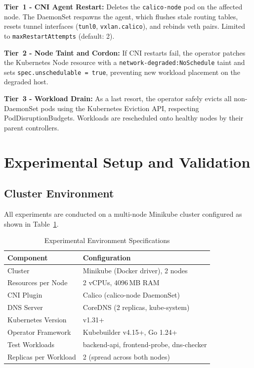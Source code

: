 \documentclass[conference]{IEEEtran}
\begin{document}
\noindent\textbf{Tier~1 - CNI Agent Restart:} Deletes the \texttt{calico-node} pod on the affected node. The DaemonSet respawns the agent, which flushes stale routing tables, resets tunnel interfaces (\texttt{tunl0}, \texttt{vxlan.calico}), and rebinds veth pairs. Limited to \texttt{maxRestartAttempts} (default: 2).

\noindent\textbf{Tier~2 - Node Taint and Cordon:} If CNI restarts fail, the operator patches the Kubernetes Node resource with a \texttt{network-degraded:NoSchedule} taint and sets \texttt{spec.unschedulable = true}, preventing new workload placement on the degraded host.

\noindent\textbf{Tier~3 - Workload Drain:} As a last resort, the operator safely evicts all non-DaemonSet pods using the Kubernetes Eviction API, respecting PodDisruptionBudgets. Workloads are rescheduled onto healthy nodes by their parent controllers.


\section{Experimental Setup and Validation}

\subsection{Cluster Environment}
All experiments are conducted on a multi-node Minikube cluster configured as shown in Table~\ref{tab:env-spec}.

\begin{table}[t]
\centering
\caption{Experimental Environment Specifications}
\label{tab:env-spec}
\renewcommand{\arraystretch}{1.1}
\setlength{\tabcolsep}{4pt}
\footnotesize
\begin{tabular}{@{}l l@{}}
\toprule
\textbf{Component} & \textbf{Configuration} \\
\midrule
Cluster & Minikube (Docker driver), 2 nodes \\
Resources per Node & 2 vCPUs, 4096\,MB RAM \\
CNI Plugin & Calico (calico-node DaemonSet) \\
DNS Server & CoreDNS (2 replicas, kube-system) \\
Kubernetes Version & v1.31+ \\
Operator Framework & Kubebuilder v4.15+, Go 1.24+ \\
Test Workloads & backend-api, frontend-probe, dns-checker \\
Replicas per Workload & 2 (spread across both nodes) \\
\bottomrule
\end{tabular}
\end{table}
\end{document}
